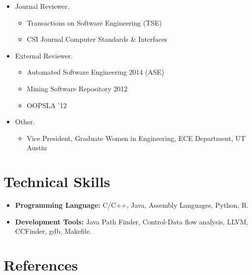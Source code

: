 \documentclass[overlapped,line,letterpaper, 12pt]{res}
\begin{document}
\begin{resume}
\begin{itemize}
\item
Journal Reviewer.

\begin{itemize}
\item
{\small Transactions on Software Engineering (TSE)}
\item
{\small  CSI Journal Computer Standards \& Interfaces}
\end{itemize}

\item
External Reviewer.
\begin{itemize}
\item
 {\small Automated Software Engineering 2014 (ASE)}
 \item
 {\small  Mining Software Repository  2012}
 \item
 {\small OOPSLA '12}
 \end{itemize}

\item
Other.
\begin{itemize}
\item
Vice President, {Graduate Women in Engineering, ECE Department,  UT Austin}
\end{itemize}
\end{itemize}

\section{\bf Technical Skills}
\begin{itemize}
\item {\bf Programming Language:} {\small C/C++, Java, Assembly Languages, Python, R}.
\item {\bf Development Tools:} {\small Java Path Finder, Control-Data flow analysis, LLVM, CCFinder, gdb, Makefile}.

\end{itemize}

\section{\bf References}


\end{resume}
\end{document}
